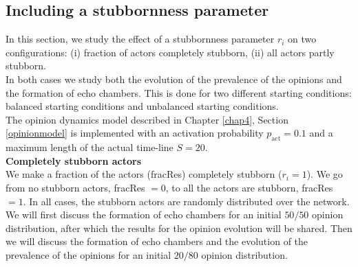 \documentclass[11 pt , letterpaper , twoside , openright]{book}
\begin{document}
\subsection{Including a stubbornness parameter}
\label{stubbpar}

In this section, we study the effect of a stubbornness parameter $r_i$ on two configurations: (i) fraction of actors completely stubborn, (ii) all actors partly stubborn.\\
\newline
In both cases we study both the evolution of the prevalence of the opinions and the formation of echo chambers. This is done for two different starting conditions: balanced starting conditions and unbalanced starting conditions. \\
\newline
The opinion dynamics model described in Chapter \ref{chap4}, Section \ref{opinionmodel} is implemented with an activation probability $p_{\text{act}} = 0.1$ and a maximum length of the actual time-line $S = 20$.\\
\newline
\textbf{Completely stubborn actors}\\
\newline
We make a fraction of the actors (fracRes) completely stubborn ($r_i = 1$). We go from no stubborn actors, fracRes $=0$, to all the actors are stubborn, fracRes $=1$. In all cases, the stubborn actors are randomly distributed over the network.\\
\newline
We will first discuss the formation of echo chambers for an initial $50/50$ opinion distribution, after which the results for the opinion evolution will be shared. Then we will discuss the formation of echo chambers and the evolution of the prevalence of the opinions for an initial $20/80$ opinion distribution.
\end{document}
